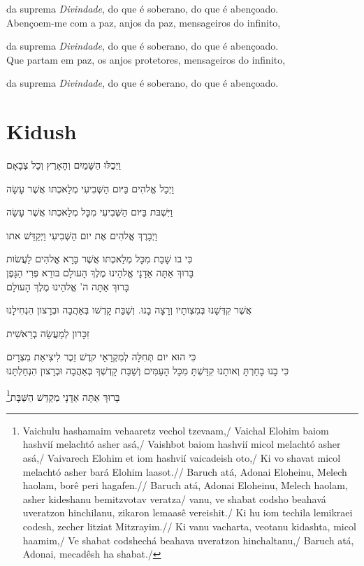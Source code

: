da suprema \emph{Divindade}, do que é soberano, do que é \qb{}abençoado.\\[10pt]

Abençoem-me com a paz, anjos da paz, mensageiros \qb{}do infinito,

da suprema \emph{Divindade}, do que é soberano, do que é \qb{}abençoado.\\[10pt]

Que partam em paz, os anjos protetores, mensageiros \qb{}do infinito,

da suprema \emph{Divindade}, do que é soberano, do que é \qb{}abençoado.

\movetoevenpage
\raggedleft

\section{Kidush}

וַיְכֻלּוּ הַשָּׁמַיִם וְהָאָרֶץ וְכָל צְבָאָם

וַיְכַל אֱלהִים בַּיּום הַשְּׁבִיעִי מְלַאכְתּו אֲשֶׁר עָשָׂה

וַיִּשְׁבּת בַּיּום הַשְּׁבִיעִי מִכָּל מְלַאכְתּו אֲשֶׁר עָשָׂה

וַיְבָרֶךְ אֱלהִים אֶת יום הַשְּׁבִיעִי וַיְקַדֵּשׁ אתו

כִּי בו שָׁבַת מִכָּל מְלַאכְתּו אֲשֶׁר בָּרָא אֱלהִים לַעֲשׂות\\[10pt]

בָּרוּךְ אַתָּה אַדָנָי אֱלהֵינוּ מֶלֶךְ הָעולָם בּורֵא פְּרִי הַגָּפֶן\\[10pt]

בָּרוּךְ אַתָּה ה' אֱלהֵינוּ מֶלֶךְ הָעולָם

אֲשֶׁר קִדְּשָׁנוּ בְּמִצְותָיו וְרָצָה בָנוּ. וְשַׁבַּת קָדְשׁו
בְּאַהֲבָה וּבְרָצון הִנְחִילָנוּ

זִכָּרון לְמַעֲשֵׂה בְרֵאשִׁית

כִּי הוּא יום תְּחִלָּה לְמִקְרָאֵי קדֶשׁ זֵכֶר לִיצִיאַת מִצְרָיִם\\[10pt]

כִּי בָנוּ בָחַרְתָּ וְאותָנוּ קִדַּשְׁתָּ מִכָּל הָעַמִּים וְשַׁבַּת
קָדְשְׁךָ בְּאַהֲבָה וּבְרָצון הִנְחַלְתָּנוּ

בָּרוּךְ אַתָּה אַדָנָי מְקַדֵּשׁ הַשַּׁבָּת\footnote{
Vaichulu hashamaim vehaaretz vechol tzevaam,/
Vaichal Elohim baiom hashvií melachtó asher asá,/
Vaishbot baiom hashvií micol melachtó asher asá,/
Vaivarech Elohim et iom hashvií vaicadeish oto,/
Ki vo shavat micol melachtó asher bará Elohim laasot.//
Baruch atá, Adonai Eloheinu, Melech haolam, borê peri hagafen.//
Baruch atá, Adonai Eloheinu, Melech haolam, asher kideshanu bemitzvotav veratza/
vanu, ve shabat codsho beahavá uveratzon hinchilanu, zikaron lemaasê vereishit./
Ki hu iom techila lemikraei codesh, zecher litziat Mitzrayim.//
Ki vanu vacharta, veotanu kidashta, micol haamim,/
Ve shabat codshechá beahava uveratzon hinchaltanu,/
Baruch atá, Adonai, mecadêsh ha shabat./}

